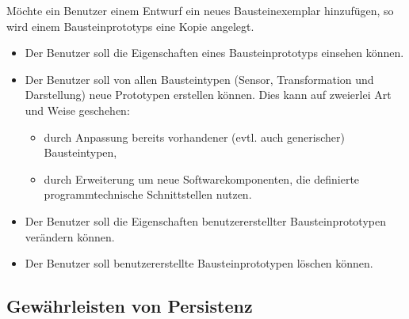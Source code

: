 \documentclass[parskip=full]{scrartcl}
\begin{document}
Möchte ein Benutzer einem Entwurf ein neues Bausteinexemplar hinzufügen, so wird einem \glspl{Bausteinprototyp} eine Kopie angelegt.

\begin{itemize}
	
	\item 
	\begin{SollKrit} 
		Der Benutzer soll die Eigenschaften eines Bausteinprototyps einsehen können.
	\end{SollKrit}
	
	\item Der Benutzer soll von allen Bausteintypen (Sensor, Transformation und Darstellung) neue Prototypen erstellen können. Dies kann auf zweierlei Art und Weise geschehen: 
	
	\begin{itemize}
		
		\item 
		\begin{SollKrit} 
			durch Anpassung bereits vorhandener (evtl. auch generischer) Bausteintypen,
		\end{SollKrit}
		
		\item 
		\begin{WunschKrit} 
			durch Erweiterung um neue Softwarekomponenten, die definierte programmtechnische Schnittstellen nutzen.
		\end{WunschKrit}
		
	\end{itemize}
	
	\item 
	\begin{SollKrit}
		Der Benutzer soll die Eigenschaften benutzererstellter Bausteinprototypen verändern können.
	\end{SollKrit}
	
	\item 
	\begin{SollKrit}
		Der Benutzer soll benutzererstellte Bausteinprototypen löschen können.
	\end{SollKrit}
	
	
\end{itemize}

\subsection{Gewährleisten von Persistenz}
\end{document}
